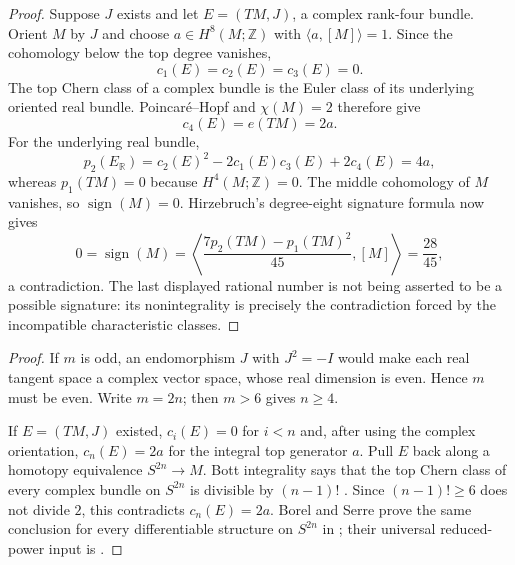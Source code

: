 \begin{proof}
Suppose $J$ exists and let $E=(TM,J)$, a complex rank-four bundle.  Orient
$M$ by $J$ and choose $a\in H^8(M;\mathbb Z)$ with
$\langle a,[M]\rangle=1$.  Since the cohomology below the top degree
vanishes,
\[
 c_1(E)=c_2(E)=c_3(E)=0.
\]
The top Chern class of a complex bundle is the Euler class of its underlying
oriented real bundle.  Poincar\'e--Hopf and $\chi(M)=2$ therefore give
\[
 c_4(E)=e(TM)=2a.
\]
For the underlying real bundle,
\[
 p_2(E_{\mathbb R})=c_2(E)^2-2c_1(E)c_3(E)+2c_4(E)=4a,
\]
whereas $p_1(TM)=0$ because $H^4(M;\mathbb Z)=0$.  The middle cohomology of $M$
vanishes, so $\operatorname{sign}(M)=0$.  Hirzebruch's degree-eight
signature formula now gives
\[
 0=\operatorname{sign}(M)
 =\left\langle\frac{7p_2(TM)-p_1(TM)^2}{45},[M]\right\rangle
 =\frac{28}{45},
\]
a contradiction.  The last displayed rational number is not being asserted
to be a possible signature: its nonintegrality is precisely the
contradiction forced by the incompatible characteristic classes.
\end{proof}



\begin{proof}
If $m$ is odd, an endomorphism $J$ with $J^2=-I$ would make each real tangent
space a complex vector space, whose real dimension is even.  Hence $m$ must
be even.  Write $m=2n$; then $m>6$ gives $n\ge4$.

If $E=(TM,J)$ existed, $c_i(E)=0$ for $i<n$ and, after using the complex
orientation, $c_n(E)=2a$ for the integral top generator $a$.  Pull $E$ back
along a homotopy equivalence $S^{2n}\to M$.  Bott integrality says that the
top Chern class of every complex bundle on $S^{2n}$ is divisible by
 $(n-1)!$ \cite[Chapter~17, Section~7, Theorem~7.2,
 pp.~274--275]{h24:Husemoller1994}.  Since $(n-1)!\ge6$ does not divide $2$,
 this contradicts $c_n(E)=2a$.  Borel and Serre prove the same conclusion for every
differentiable structure on $S^{2n}$ in \cite[Section~15,
Proposition~15.1 and the following remark, p.~434]{h24:BorelSerre1953}; their
universal reduced-power input is \cite[Section~12, Propositions~12.4 and
12.6 and Lemma~12.5, p.~430]{h24:BorelSerre1953}.
\end{proof}

